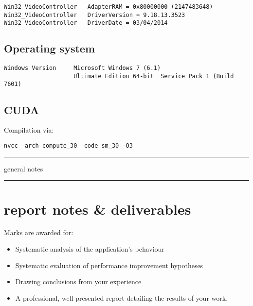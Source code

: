 \documentclass[11pt, oneside, a4paper]{article}
\begin{document}
\begin{appendices}
\begin{verbatim}
Win32_VideoController   AdapterRAM = 0x80000000 (2147483648)
Win32_VideoController   DriverVersion = 9.18.13.3523
Win32_VideoController   DriverDate = 03/04/2014
\end{verbatim}

\subsection{Operating system} %
\label{sub:operating_system}
\begin{verbatim}
Windows Version     Microsoft Windows 7 (6.1)
                    Ultimate Edition 64-bit  Service Pack 1 (Build 7601) 
\end{verbatim}

\subsection{CUDA} %
\label{sub:cuda}
Compilation via:
\begin{verbatim}
nvcc -arch compute_30 -code sm_30 -O3
\end{verbatim}

\end{appendices}


\hspace{1em}
\hrule
general notes
\hspace{1em}
\hrule

\section{report notes \& deliverables} %
\label{sec:report_notes_on_deliverables}

Marks are awarded for:
\begin{itemize}
\item  Systematic analysis of the application's behaviour
\item  Systematic evaluation of performance improvement hypotheses
\item  Drawing conclusions from your experience
\item  A professional, well-presented report detailing the results of your work.
\end{itemize}
\end{document}
